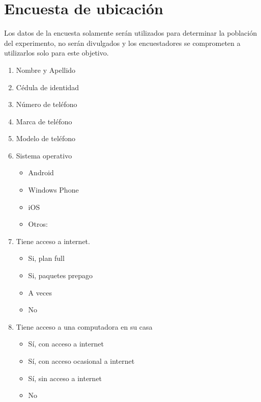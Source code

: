 \section{Encuesta de ubicación}

Los datos de la encuesta solamente serán utilizados para determinar la población
del experimento, no serán divulgados y los encuestadores se comprometen a
utilizarlos solo para este objetivo.

\begin{enumerate}
    \item Nombre y Apellido
    \item Cédula de identidad
    \item Número de teléfono
    \item Marca de teléfono
    \item Modelo de teléfono
    \item Sistema operativo
    \begin{itemize}
        \item Android
        \item Windows Phone
        \item iOS
        \item Otros: 
    \end{itemize}
    \item Tiene acceso a internet.
    \begin{itemize}
        \item Si, plan full
        \item Si, paquetes prepago
        \item A veces
        \item No
    \end{itemize}
    \item Tiene acceso a una computadora en su casa
    \begin{itemize}
        \item Sí, con acceso a internet
        \item Sí, con acceso ocasional a internet
        \item Sí, sin acceso a internet
        \item No
    \end{itemize}
\end{enumerate}
